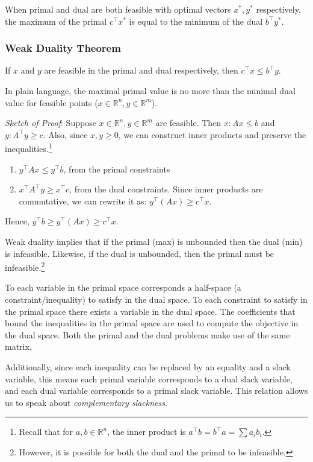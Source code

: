 \documentclass[11pt,]{article}
\providecommand{\tightlist}{%
  \setlength{\itemsep}{0pt}\setlength{\parskip}{0pt}}
\let\rmarkdownfootnote\footnote%
\def\footnote{\protect\rmarkdownfootnote}
\begin{document}
When primal and dual are both feasible with optimal vectors \(x^*, y^*\)
respectively, the maximum of the primal \(c^{\top}x^*\) is equal to the
minimum of the dual \(b^{\top}y^*\).

\subsubsection{Weak Duality Theorem}\label{weak-duality-theorem}

If \(x\) and \(y\) are feasible in the primal and dual respectively,
then \(c^{\top}x\leq b^{\top}y\).

In plain language, the maximal primal value is no more than the minimal
dual value for feasible points
(\(x\in \mathbb{R}^n, y\in \mathbb{R}^m\)).

\emph{Sketch of Proof}: Suppose \(x\in \mathbb{R}^n, y\in \mathbb{R}^m\)
are feasible. Then \(x:Ax\leq b\) and \(y:A^{\top}y\geq c\). Also, since
\(x, y \geq 0\), we can construct inner products and preserve the
inequalities.\footnote{Recall that for \(a,b\in \mathbb{R}^n\), the
  inner product is \(a^{\top}b=b^{\top}a=\sum a_ib_i\).}

\begin{enumerate}
\def\labelenumi{\arabic{enumi}.}
\tightlist
\item
  \(y^{\top}Ax \leq y^{\top}b\), from the primal constraints
\item
  \(x^{\top}A^{\top}y \geq x^{\top}c\), from the dual constraints. Since
  inner products are commutative, we can rewrite it as:
  \(y^{\top}(Ax) \geq c^{\top}x\).
\end{enumerate}

Hence, \(y^{\top}b\geq y^{\top}(Ax)\geq c^{\top}x\).

Weak duality implies that if the primal (max) is unbounded then the dual
(min) is infeasible. Likewise, if the dual is unbounded, then the primal
must be infeasible.\footnote{However, it is possible for both the dual
  and the primal to be infeasible.}

To each variable in the primal space corresponds a half-space (a
constraint/inequality) to satisfy in the dual space. To each constraint
to satisfy in the primal space there exists a variable in the dual
space. The coefficients that bound the inequalities in the primal space
are used to compute the objective in the dual space. Both the primal and
the dual problems make use of the same matrix.

Additionally, since each inequality can be replaced by an equality and a
slack variable, this means each primal variable corresponds to a dual
slack variable, and each dual variable corresponds to a primal slack
variable. This relation allows us to speak about \emph{complementary
slackness}.
\end{document}
